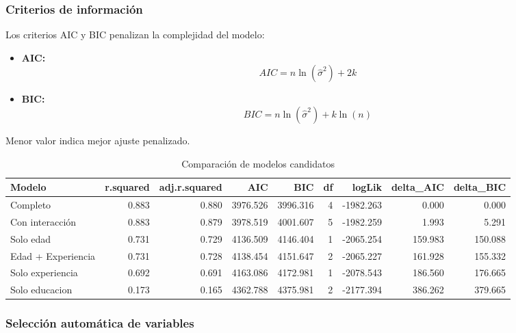 \documentclass[
  oneside]{book}
\providecommand{\tightlist}{%
  \setlength{\itemsep}{0pt}\setlength{\parskip}{0pt}}
\begin{document}
\subsubsection{Criterios de información}\label{criterios-de-informaciuxf3n}

Los criterios AIC y BIC penalizan la complejidad del modelo:

\begin{itemize}
\tightlist
\item
  \textbf{AIC:}
  \begin{equation}
  AIC = n \ln(\hat{\sigma}^2) + 2k 
  \end{equation}
\item
  \textbf{BIC:}
  \begin{equation} 
  BIC = n \ln(\hat{\sigma}^2) + k \ln(n) 
  \end{equation}
\end{itemize}

Menor valor indica mejor ajuste penalizado.

\begin{table}
\centering
\caption{\label{tab:criterios-informacion}Comparación de modelos candidatos}
\centering
\begin{tabular}[t]{l|r|r|r|r|r|r|r|r}
\hline
Modelo & r.squared & adj.r.squared & AIC & BIC & df & logLik & delta\_AIC & delta\_BIC\\
\hline
Completo & 0.883 & 0.880 & 3976.526 & 3996.316 & 4 & -1982.263 & 0.000 & 0.000\\
\hline
Con interacción & 0.883 & 0.879 & 3978.519 & 4001.607 & 5 & -1982.259 & 1.993 & 5.291\\
\hline
Solo edad & 0.731 & 0.729 & 4136.509 & 4146.404 & 1 & -2065.254 & 159.983 & 150.088\\
\hline
Edad + Experiencia & 0.731 & 0.728 & 4138.454 & 4151.647 & 2 & -2065.227 & 161.928 & 155.332\\
\hline
Solo experiencia & 0.692 & 0.691 & 4163.086 & 4172.981 & 1 & -2078.543 & 186.560 & 176.665\\
\hline
Solo educacion & 0.173 & 0.165 & 4362.788 & 4375.981 & 2 & -2177.394 & 386.262 & 379.665\\
\hline
\end{tabular}
\end{table}

\subsubsection{Selección automática de variables}\label{selecciuxf3n-automuxe1tica-de-variables}
\end{document}
